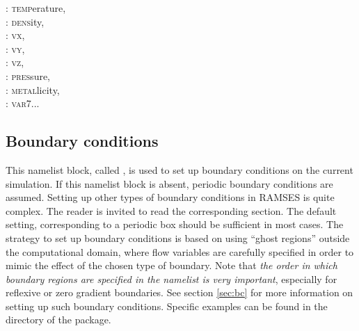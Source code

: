 \begin{nmltable}
{   : \textsc{temp}erature,\\
   : \textsc{dens}ity,\\
   : \textsc{vx},\\
   : \textsc{vy},\\
   : \textsc{vz},\\
   : \textsc{pres}sure,\\
   : \textsc{metal}licity,\\
   : \textsc{var7}...
   }


\end{nmltable}


\clearpage
\subsection{Boundary conditions}

This namelist block, called , is used to set up
boundary conditions on the current simulation. If this namelist block is
absent, periodic boundary conditions are assumed. Setting up other types of
boundary conditions in RAMSES is quite complex. The reader is invited to read
the corresponding section. The default setting, corresponding to a periodic box
should be sufficient in most cases. The strategy to set up boundary conditions
is based on using ``ghost regions'' outside the computational domain, where
flow variables are carefully specified in order to mimic the effect of the
chosen type of boundary. Note that \emph{the order in which boundary regions
are specified in the namelist is very important}, especially for reflexive or
zero gradient boundaries. See section \ref{sec:bc} for more information on
setting up such boundary conditions. Specific examples can be found in the
 directory of the package.

